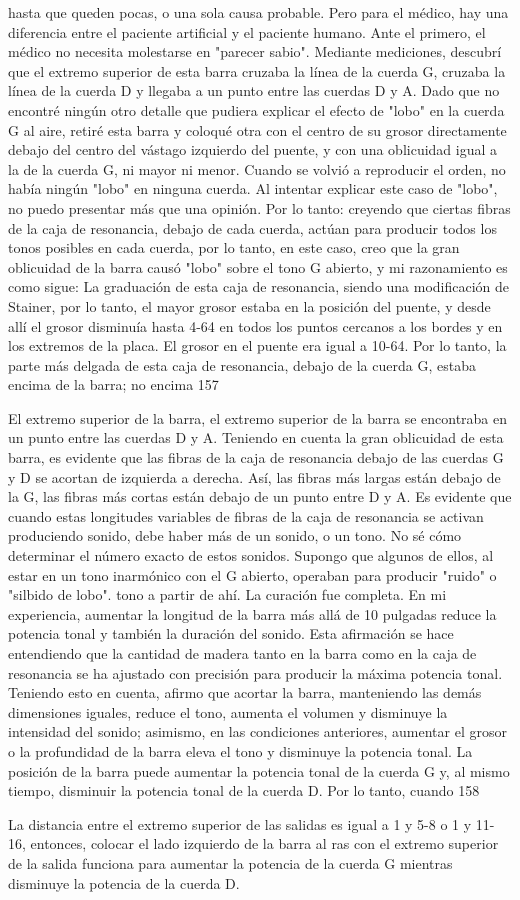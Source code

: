 hasta que queden pocas, o una sola causa probable. Pero para el médico, hay una diferencia entre el paciente artificial y el paciente humano. Ante el primero, el médico no necesita molestarse en "parecer sabio".
Mediante mediciones, descubrí que el extremo superior de esta barra cruzaba la línea de la cuerda G, cruzaba la línea de la cuerda D y llegaba a un punto entre las cuerdas D y A. Dado que no encontré ningún otro detalle que pudiera explicar el efecto de "lobo" en la cuerda G al aire, retiré esta barra y coloqué otra con el centro de su grosor directamente debajo del centro del vástago izquierdo del puente, y con una oblicuidad igual a la de la cuerda G, ni mayor ni menor.
Cuando se volvió a reproducir el orden, no había ningún "lobo" en ninguna cuerda.
Al intentar explicar este caso de "lobo", no puedo presentar más que una opinión. Por lo tanto: creyendo que ciertas fibras de la caja de resonancia, debajo de cada cuerda, actúan para producir todos los tonos posibles en cada cuerda, por lo tanto, en este caso, creo que la gran oblicuidad de la barra causó
"lobo" sobre el tono G abierto, y mi razonamiento
es como sigue: La graduación de esta caja de resonancia, siendo una modificación de Stainer, por lo tanto, el mayor grosor estaba en la posición del puente, y desde allí el grosor disminuía hasta 4-64 en todos los puntos cercanos a los bordes y en los extremos de la placa. El grosor en el puente era igual a 10-64. Por lo tanto, la parte más delgada de esta caja de resonancia, debajo de la cuerda G, estaba encima de la barra; no encima
157

El extremo superior de la barra, el extremo superior de la barra se encontraba en un punto entre las cuerdas D y A. Teniendo en cuenta la gran oblicuidad de esta barra, es evidente que las fibras de la caja de resonancia debajo de las cuerdas G y D se acortan de izquierda a derecha. Así, las fibras más largas están debajo de la G, las fibras más cortas están debajo de un punto entre D y A. Es evidente que cuando estas longitudes variables de fibras de la caja de resonancia se activan produciendo sonido, debe haber más de un sonido, o un tono. No sé cómo determinar el número exacto de estos sonidos. Supongo que algunos de ellos, al estar en un tono inarmónico con el G abierto, operaban para producir "ruido" o "silbido de lobo".
tono a partir de ahí.
La curación fue completa.
En mi experiencia, aumentar la longitud de la barra más allá de 10 pulgadas reduce la potencia tonal y también la duración del sonido. Esta afirmación se hace entendiendo que la cantidad de madera tanto en la barra como en la caja de resonancia se ha ajustado con precisión para producir la máxima potencia tonal. Teniendo esto en cuenta, afirmo que acortar la barra, manteniendo las demás dimensiones iguales, reduce el tono, aumenta el volumen y disminuye la intensidad del sonido; asimismo, en las condiciones anteriores, aumentar el grosor o la profundidad de la barra eleva el tono y disminuye la potencia tonal. La posición de la barra puede aumentar la potencia tonal de la cuerda G y, al mismo tiempo, disminuir la potencia tonal de la cuerda D. Por lo tanto, cuando
158

La distancia entre el extremo superior de las salidas es igual a 1 y 5-8 o 1 y 11-16, entonces, colocar el lado izquierdo de la barra al ras con el extremo superior de la salida funciona para aumentar la potencia de la cuerda G mientras disminuye la potencia de la cuerda D.
